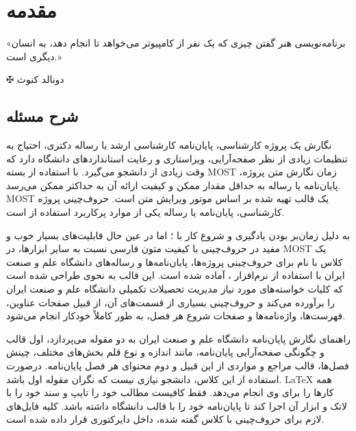 
\chapter{مقدمه}\label{chapter1}
\thispagestyle{empty}
\epigraph{
«برنامه‌نویسی هنر گفتن چیزی که یک نفر از کامپیوتر می‌خواهد تا انجام دهد، به انسان دیگری است.»
}
{$ \maltese $ {\large دونالد کنوث}}

\section{شرح مسئله}\label{sec1}

 \begin{comment}
نمونه یک توضیح چند خطی در لاتک. محتویات این محیط در  خروجی پی‌دی‌اف تولید شده توسط لاتک درج نمی‌شود.
مثال‌هایی از نحوه استفاده از فونت‌های مختلف موجود در قالب پایان‌نامه علم صنعت.
پیش نمایش 
{\titlefont{پیش نمایش}}
{\iranic{پیش نمایش}}
\textit{پیش نمایش}
\textbf{پیش نمایش}
{\nastaliq پیش نمایش}
{\yagut پیش نمایش}

\end{comment}
نگارش یک پروژه کارشناسی، پایان‌نامه کارشناسی ارشد یا رساله دکتری،  احتیاج به تنظیمات زیادی از نظر صفحه‌آرایی، ویراستاری و رعایت استاندارد‌های دانشگاه دارد که وقت زیادی از دانشجو می‌گیرد.  با استفاده از بسته 
\gls{MOST}
زمان نگارش متن پروژه، پایان‌نامه یا رساله به حداقل مقدار ممکن و کیفیت ارائه آن به حداکثر ممکن می‌رسد.
\gls{MOST}
یک قالب تهیه شده بر اساس موتور ویرایش متن
\XePersian
است.
 حروف‌چینی پروژه کارشناسی، پایان‌نامه یا رساله یکی از موارد پرکاربرد استفاده از 
 \XePersian
  است. 
 \par
به دلیل زمان‌بر بودن یادگیری و شروع کار با 
\XeTeX؛
  اما در عین حال قابلیت‌های بسیار خوب و مفید در حروف‌چینی با کیفیت متون فارسی نسبت به سایر ابزارها،
 در 
\gls{MOST}
یک کلاس با نام 
 برای حروف‌چینی پروژه‌ها، پایان‌نامه‌ها و رساله‌های دانشگاه علم و صنعت ایران با استفاده از نرم‌افزار 
 \XePersian،
آماده شده است. 
 این قالب به نحوی طراحی شده است که کلیات خواسته‌های مورد نیاز مدیریت تحصیلات تکمیلی دانشگاه علم و صنعت ایران  را برآورده می‌کند و حروف‌چینی بسیاری از قسمت‌های آن، از قبیل صفحات عناوین، فهرست‌ها، واژه‌نامه‌ها و صفحات شروع هر فصل، به طور کاملاً خودکار انجام می‌شود.
 \par
 راهنمای نگارش پایان‌نامه دانشگاه علم و صنعت ایران به دو مقوله می‌پردازد، اول قالب و چگونگی صفحه‌آرایی پایان‌نامه، مانند اندازه و نوع قلم بخش‌های مختلف، چینش فصل‌ها، قالب مراجع و مواردی از این قبیل و دوم محتوای هر فصل پایان‌نامه. 
 درصورت استفاده از این کلاس، دانشجو  نیازی نیست که نگران مقوله اول باشد. 
 \LaTeX
  همه کارها را برای وی انجام می‌دهد. فقط کافیست مطالب خود را تایپ و سند خود را با لاتک و ابزار آن اجرا کند تا پایان‌نامه خود را با قالب دانشگاه داشته باشد.
 کلیه فایل‌های لازم برای حروف‌چینی با کلاس گفته شده، داخل دایرکتوری
 قرار داده شده است.  
 
